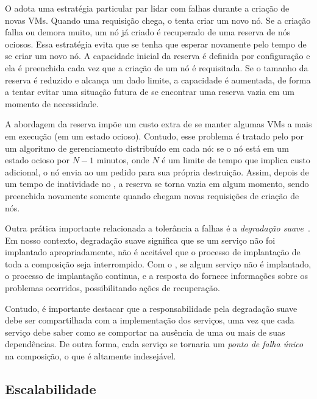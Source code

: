 O \ee adota uma estratégia particular par lidar com falhas durante a criação de novas VMs.
Quando uma requisição chega, o \ee tenta criar um novo nó.
Se a criação falha ou demora muito, um nó já criado é recuperado de uma reserva de nós ociosos.
Essa estratégia evita que se tenha que esperar novamente pelo tempo de se criar um novo nó.
A capacidade inicial da reserva é definida por configuração
e ela é preenchida cada vez que a criação de um nó é requisitada.
Se o tamanho da reserva é reduzido e alcança um dado limite,
a capacidade é aumentada, de forma a tentar evitar uma situação futura
de se encontrar uma reserva vazia em um momento de necessidade.

A abordagem da reserva impõe um custo extra de se manter algumas VMs a mais
em execução (em um estado ocioso). Contudo, esse problema é tratado
pelo \ee por um algoritmo de gerenciamento distribuído em cada nó:
se o nó está em um estado ocioso por $N-1$ minutos, onde $N$ é um limite
de tempo que implica custo adicional, o nó envia ao \ee um pedido para 
sua própria destruição. Assim, depois de um tempo de inatividade no \ee,
a reserva se torna vazia em algum momento, sendo preenchida novamente
somente quando chegam novas requisições de criação de nós.


Outra prática importante relacionada a tolerância a falhas é a 
\emph{degradação suave}~\cite{Brewer2001GiantScale,Hamilton2007InternetScale}.
Em nosso contexto, degradação suave significa que se um serviço não foi 
implantado apropriadamente, não é aceitável que o processo de implantação
de toda a composição seja interrompido.
Com o \ee, se algum serviço não é implantado, o processo de implantação continua,
e a resposta do \ee fornece informações sobre os problemas ocorridos,
possibilitando ações de recuperação.

Contudo, é importante destacar que a responsabilidade pela degradação suave
debe ser compartilhada com a implementação dos serviços, uma vez que cada serviço
debe saber como se comportar na ausência de uma ou mais de suas dependências.
De outra forma, cada serviço se tornaria um \emph{ponto de falha único} na composição,
o que é altamente indesejável.

\subsection{Escalabilidade}

